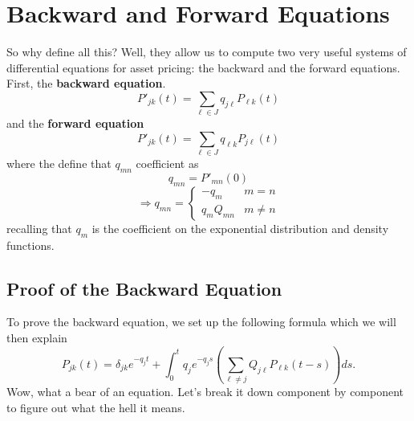 \documentclass[a4paper,11pt]{scrartcl}
\begin{document}
\section{Backward and Forward Equations}

So why define all this? Well, they allow us to compute two very 
useful systems of differential
equations for asset pricing: the backward and the forward equations.  
First, the \textbf{backward equation}.
\begin{equation}
	P'_{jk}(t) = \sum_{\ell \in J} q_{j\ell}P_{\ell k}(t) 
\end{equation}
and the \textbf{forward equation}
\begin{equation}
	P'_{jk}(t) = \sum_{\ell \in J} q_{\ell k} P_{j\ell}(t) 
\end{equation}
where the define that $q_{mn}$ coefficient as 
	\[ q_{mn} = P'_{mn}(0) \]
	\[ \Rightarrow q_{mn} = \begin{cases} -q_m & m=n \\ 
	   q_m  Q_{mn} &  m \neq n \end{cases} \]
recalling that $q_m$ is the coefficient on the exponential distribution 
and density functions. 

\subsection{Proof of the Backward Equation}

To prove the backward equation, we set up the following formula which 
we will then explain
  \[ P_{jk}(t) = \delta_{jk} e^{-q_j t} + \int_0^t  q_j e^{-q_j s} 
      \left( \sum_{\ell \neq j} Q_{j\ell}P_{\ell k}(t-s) \right) ds. \]
Wow, what a bear of an equation.  Let's break it down component by 
component to figure out what the hell it means.
\end{document}
